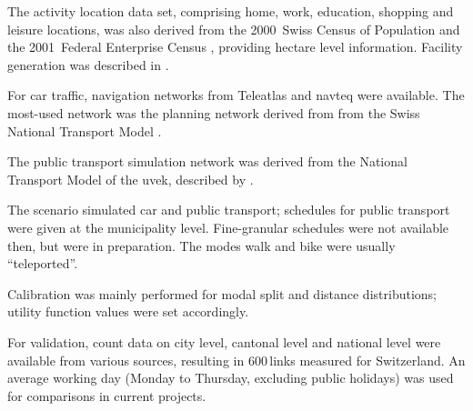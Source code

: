 The activity location data set, comprising home, work, education, shopping and leisure locations, was also derived from the 2000~Swiss Census of Population and the 2001~Federal Enterprise Census \citep[][]{SwissEnterpriseCensus_manual_2001}, providing hectare level information. Facility generation was described in \citet[][p.33]{BalmerEtAl_ResRep_bdktzrh_2009}.

For car traffic, navigation networks from Teleatlas \citep[][]{MultiNet_Webpage_2010} and \gls{navteq} \citep[][]{Navteq_2011} were available. The most-used network was the planning network derived from from the Swiss National Transport Model \citep[][]{VrticEtAl_BiegerEtAl_2003}.

The public transport simulation network was derived from the National Transport Model of the \gls{uvek}, described by \citet[][]{VrticFroehlich_ResRep_UVEK_2010}. 

The scenario simulated car and public transport; schedules for public transport were given at the municipality level. Fine-granular schedules were not available then, but were in preparation. The modes walk and bike were usually ``\gls{teleported}''. 

Calibration was mainly performed for modal split and distance distributions; utility function values were set accordingly.

For validation, count data on city level, cantonal level and national level \citep[][]{ASTRA_Webpage_2006} were available from various sources, resulting in 600\,links measured for Switzerland. An average working day (Monday to Thursday, excluding public holidays) was used for comparisons in current projects.

